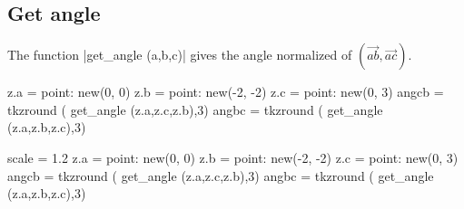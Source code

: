   \hspace*{\fill}
 \hspace*{\fill}


\subsection{Get angle} %
\label{sub:get_angle}

The function  |get_angle (a,b,c)| gives the angle normalized of $(\overrightarrow{ab},\overrightarrow{ac})$.

\begin{minipage}{0.6\textwidth}
\begin{tkzexample}[latex=0cm,small,code only]
\begin{tkzelements}
   z.a   = point: new(0, 0)
   z.b   = point: new(-2, -2)
   z.c   = point: new(0, 3)
   angcb = tkzround ( get_angle (z.a,z.c,z.b),3)
   angbc = tkzround ( get_angle (z.a,z.b,z.c),3)
\end{tkzelements}

\end{tkzexample}
\end{minipage}
\begin{minipage}{0.4\textwidth}
\begin{tkzelements}
   scale = 1.2
   z.a   = point: new(0, 0)
   z.b   = point: new(-2, -2)
   z.c   = point: new(0, 3)
   angcb = tkzround ( get_angle (z.a,z.c,z.b),3)
   angbc = tkzround ( get_angle (z.a,z.b,z.c),3)
\end{tkzelements}

\hspace*{\fill}
\hspace*{\fill}
\end{minipage}


